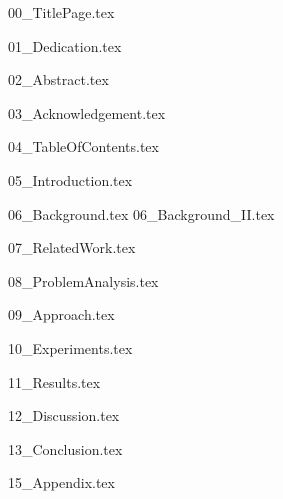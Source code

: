 \documentclass[version=last, pagesize=auto, paper=a4]{scrartcl}%
\begin{document}
{00_TitlePage.tex}

{01_Dedication.tex}

{02_Abstract.tex}

{03_Acknowledgement.tex}

{04_TableOfContents.tex}

{05_Introduction.tex}

{06_Background.tex}
{06_Background_II.tex}

{07_RelatedWork.tex}

{08_ProblemAnalysis.tex}

{09_Approach.tex}

{10_Experiments.tex}

{11_Results.tex}

{12_Discussion.tex}

{13_Conclusion.tex}


\clearpage



{15_Appendix.tex}

\end{document}
